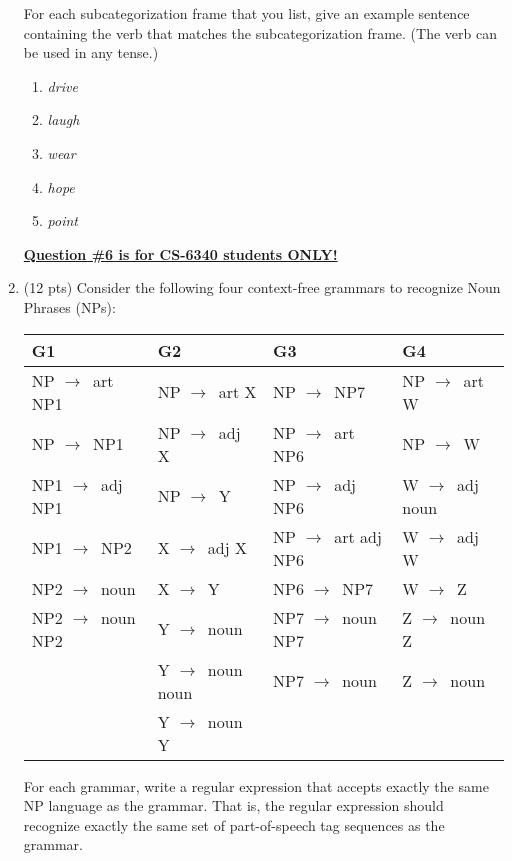 \documentclass[11pt]{article}
\newcommand{\ra}{$\rightarrow$~}
\begin{document}
\begin{enumerate}
For each  subcategorization frame that you list, give an example
sentence containing the verb that matches the subcategorization
frame.  (The verb can be used in any tense.)

\begin{enumerate}

\item {\it drive}

\item {\it laugh}

\item {\it wear}

\item {\it hope}

\item {\it point}


\end{enumerate}


\newpage
\underline{\textbf{Question \#6 is for CS-6340 students ONLY!}}  \\

\item (12 pts) Consider the following four context-free grammars to
  recognize Noun Phrases (NPs):

\begin{center}
\begin{tabular}{|l|l|l|l|} \hline
{\bf G1} & {\bf G2} & {\bf G3} & {\bf G4} \\ \hline
NP \ra art NP1   & NP \ra art X    & NP \ra NP7         & NP \ra art W \\
NP \ra NP1       & NP \ra adj X    & NP \ra art NP6     & NP \ra W \\
NP1 \ra adj NP1  & NP \ra Y        & NP \ra adj NP6     & W \ra adj noun \\
NP1 \ra NP2      & X \ra adj X     & NP \ra art adj NP6 & W \ra adj W \\
NP2 \ra noun     & X \ra Y         & NP6 \ra NP7        & W \ra Z \\
NP2 \ra noun NP2 & Y \ra noun      & NP7 \ra noun NP7   & Z \ra noun Z \\
~                & Y \ra noun noun & NP7 \ra noun       & Z \ra noun \\
~                & Y \ra noun Y    & ~                  & ~        \\ \hline
\end{tabular}
\end{center}

\vspace*{.2in}
For each grammar, write a regular expression that accepts
exactly the same NP language as the grammar. That is, the regular
expression should recognize exactly the same set of part-of-speech tag
sequences as the grammar.


\end{enumerate}
\end{document}

